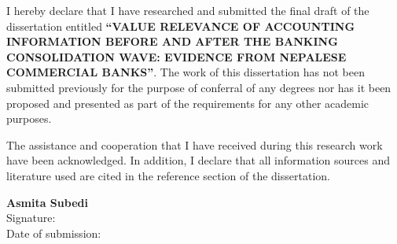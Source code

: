 \clearpage
{}
\thispagestyle{plain}

\vspace{1.5cm}

I hereby declare that I have researched and submitted the final draft of the dissertation entitled \textbf{``VALUE RELEVANCE OF ACCOUNTING INFORMATION BEFORE AND AFTER THE BANKING CONSOLIDATION WAVE: EVIDENCE FROM NEPALESE COMMERCIAL BANKS''}. The work of this dissertation has not been submitted previously for the purpose of conferral of any degrees nor has it been proposed and presented as part of the requirements for any other academic purposes.

The assistance and cooperation that I have received during this research work have been acknowledged. In addition, I declare that all information sources and literature used are cited in the reference section of the dissertation.

\vspace{3.5cm}

\begin{flushleft}
\fomSignatureFont
\textbf{Asmita Subedi}\\
Signature:\\
Date of submission:
\end{flushleft}

